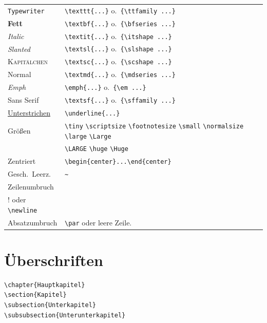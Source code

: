 \begin{tabular}{l|l}
\texttt{Typewriter} & \lstinline!\texttt{...}! o.\ \lstinline!{\ttfamily ...}!\\ 
\textbf{Fett} & \lstinline!\textbf{...}! o.\ \lstinline!{\bfseries ...}!\\ 
\textit{Italic} & \lstinline!\textit{...}! o.\ \lstinline!{\itshape ...}!\\ 
\textsl{Slanted} & \lstinline!\textsl{...}! o.\ \lstinline!{\slshape ...}!\\ 
\textsc{Kapitälchen} & \lstinline!\textsc{...}! o.\ \lstinline!{\scshape ...}!\\ 
\textmd{Normal} & \lstinline!\textmd{...}! o.\ \lstinline!{\mdseries ...}!\\ 
\emph{Emph} & \lstinline!\emph{...}! o.\ \lstinline!{\em ...}!\\ 
\textsf{Sans Serif} & \lstinline!\textsf{...}! o.\ \lstinline!{\sffamily ...}!\\
\underline{Unterstrichen} & \lstinline!\underline{...}!\\
Größen & \lstinline!\tiny! \lstinline!\scriptsize! \lstinline!\footnotesize! \lstinline!\small! \lstinline!\normalsize! \lstinline!\large! \lstinline!\Large!\\
 & \lstinline!\LARGE! \lstinline!\huge! \lstinline!\Huge!\\ 
Zentriert & \lstinline!\begin{center}...\end{center}!\\
Gesch.\ Leerz. & \lstinline!~!\\
Zeilenumbruch & \lstinline!\\! oder \lstinline!\newline!\\
Absatzumbruch & \lstinline!\par! oder leere Zeile.\\

\end{tabular}


\section{Überschriften}

\begin{Verbatim}[frame=single]
\chapter{Hauptkapitel}
\section{Kapitel}
\subsection{Unterkapitel}
\subsubsection{Unterunterkapitel}
\end{Verbatim}

